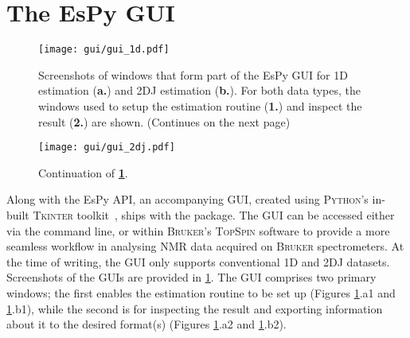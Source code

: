 \section{The \acs{EsPy} \acs{GUI}}
\begin{figure}
    \centering
    \texttt{[image: gui/gui\_1d.pdf]}
    \caption[
        Screenshots of the \acs{EsPy} \acs{GUI} for \acs{1D} and \acs{2DJ} estimation.
    ]{
        Screenshots of windows that form part of the \ac{EsPy} \ac{GUI} for
        \ac{1D} estimation (\textbf{a.}) and \ac{2DJ} estimation (\textbf{b.}).
        For both data types, the windows used to setup the estimation routine
        (\textbf{1.}) and inspect the result (\textbf{2.}) are shown.
        (Continues on the next page)
    }
    \label{fig:gui}
\end{figure}
\begin{figure}%
    \ContinuedFloat
    \centering
    \texttt{[image: gui/gui\_2dj.pdf]}
    \caption*{Continuation of \textbf{\cref{fig:gui}}.}
\end{figure}
Along with the \ac{EsPy} \ac{API}, an accompanying \ac{GUI}, created using
\textsc{Python}'s in-built \textsc{Tkinter} toolkit~\cite{tkinter}, ships with
the package. The \ac{GUI} can be accessed either via the command line, or within
\textsc{Bruker}'s \textsc{TopSpin} software to provide a more seamless workflow
in analysing \ac{NMR} data acquired on \textsc{Bruker} spectrometers.
At the time of writing, the \ac{GUI} only supports conventional \ac{1D}
and \ac{2DJ} datasets. Screenshots of the \acp{GUI} are provided in
\cref{fig:gui}.
The \ac{GUI} comprises two primary windows; the first enables the estimation
routine to be set up (Figures \ref{fig:gui}.a1 and \ref{fig:gui}.b1), while the
second is for inspecting the result and exporting information about it to the
desired format(s) (Figures \ref{fig:gui}.a2 and \ref{fig:gui}.b2).

